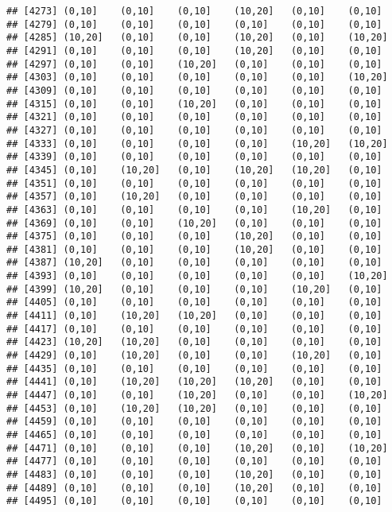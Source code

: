 \documentclass[]{article}
\begin{document}
\begin{verbatim}
## [4273] (0,10]    (0,10]    (0,10]    (10,20]   (0,10]    (0,10]   
## [4279] (0,10]    (0,10]    (0,10]    (0,10]    (0,10]    (0,10]   
## [4285] (10,20]   (0,10]    (0,10]    (10,20]   (0,10]    (10,20]  
## [4291] (0,10]    (0,10]    (0,10]    (10,20]   (0,10]    (0,10]   
## [4297] (0,10]    (0,10]    (10,20]   (0,10]    (0,10]    (0,10]   
## [4303] (0,10]    (0,10]    (0,10]    (0,10]    (0,10]    (10,20]  
## [4309] (0,10]    (0,10]    (0,10]    (0,10]    (0,10]    (0,10]   
## [4315] (0,10]    (0,10]    (10,20]   (0,10]    (0,10]    (0,10]   
## [4321] (0,10]    (0,10]    (0,10]    (0,10]    (0,10]    (0,10]   
## [4327] (0,10]    (0,10]    (0,10]    (0,10]    (0,10]    (0,10]   
## [4333] (0,10]    (0,10]    (0,10]    (0,10]    (10,20]   (10,20]  
## [4339] (0,10]    (0,10]    (0,10]    (0,10]    (0,10]    (0,10]   
## [4345] (0,10]    (10,20]   (0,10]    (10,20]   (10,20]   (0,10]   
## [4351] (0,10]    (0,10]    (0,10]    (0,10]    (0,10]    (0,10]   
## [4357] (0,10]    (10,20]   (0,10]    (0,10]    (0,10]    (0,10]   
## [4363] (0,10]    (0,10]    (0,10]    (0,10]    (10,20]   (0,10]   
## [4369] (0,10]    (0,10]    (10,20]   (0,10]    (0,10]    (0,10]   
## [4375] (0,10]    (0,10]    (0,10]    (10,20]   (0,10]    (0,10]   
## [4381] (0,10]    (0,10]    (0,10]    (10,20]   (0,10]    (0,10]   
## [4387] (10,20]   (0,10]    (0,10]    (0,10]    (0,10]    (0,10]   
## [4393] (0,10]    (0,10]    (0,10]    (0,10]    (0,10]    (10,20]  
## [4399] (10,20]   (0,10]    (0,10]    (0,10]    (10,20]   (0,10]   
## [4405] (0,10]    (0,10]    (0,10]    (0,10]    (0,10]    (0,10]   
## [4411] (0,10]    (10,20]   (10,20]   (0,10]    (0,10]    (0,10]   
## [4417] (0,10]    (0,10]    (0,10]    (0,10]    (0,10]    (0,10]   
## [4423] (10,20]   (10,20]   (0,10]    (0,10]    (0,10]    (0,10]   
## [4429] (0,10]    (10,20]   (0,10]    (0,10]    (10,20]   (0,10]   
## [4435] (0,10]    (0,10]    (0,10]    (0,10]    (0,10]    (0,10]   
## [4441] (0,10]    (10,20]   (10,20]   (10,20]   (0,10]    (0,10]   
## [4447] (0,10]    (0,10]    (10,20]   (0,10]    (0,10]    (10,20]  
## [4453] (0,10]    (10,20]   (10,20]   (0,10]    (0,10]    (0,10]   
## [4459] (0,10]    (0,10]    (0,10]    (0,10]    (0,10]    (0,10]   
## [4465] (0,10]    (0,10]    (0,10]    (0,10]    (0,10]    (0,10]   
## [4471] (0,10]    (0,10]    (0,10]    (10,20]   (0,10]    (10,20]  
## [4477] (0,10]    (0,10]    (0,10]    (0,10]    (0,10]    (0,10]   
## [4483] (0,10]    (0,10]    (0,10]    (10,20]   (0,10]    (0,10]   
## [4489] (0,10]    (0,10]    (0,10]    (10,20]   (0,10]    (0,10]   
## [4495] (0,10]    (0,10]    (0,10]    (0,10]    (0,10]    (0,10]   

\end{verbatim}
\end{document}
